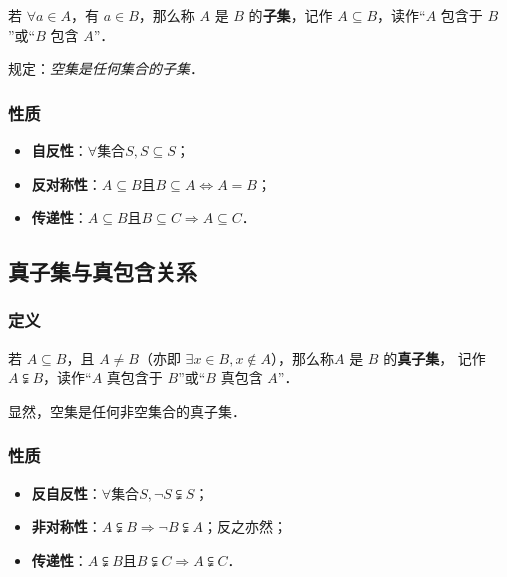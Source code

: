 \documentclass[a4paper,openany]{ctexbook}
\begin{document}
若 \(\forall a \in A\)，有 \(a \in B\)，那么称 \(A\) 是 \(B\) 的\textbf{子集}，记作 \(A \subseteq B\)，读作“\(A\) 包含于 \(B\)”或“\(B\) 包含 \(A\)”．

规定：\textit{空集是任何集合的子集}．

\subsubsection{性质}

\begin{itemize}
    \item \textbf{自反性}：\(\forall \text{集合} S, S \subseteq S\)；
    \item \textbf{反对称性}：\(A \subseteq B \text{且} B \subseteq A \Leftrightarrow A=B\)；
    \item \textbf{传递性}：\(A \subseteq B \text{且} B\subseteq C \Rightarrow A \subseteq C\)．
\end{itemize}

\subsection{真子集与真包含关系}

\subsubsection{定义}

若 \(A \subseteq B\)，且 \(A \ne B\)（亦即 \(\exists x \in B, x \not\in A\)），那么称\(A\) 是 \(B\) 的\textbf{真子集}，
记作 \(A \subsetneqq B\)，读作“\(A\) 真包含于 \(B\)”或“\(B\) 真包含 \(A\)”．

显然，空集是任何非空集合的真子集．

\subsubsection{性质}

\begin{itemize}
    \item \textbf{反自反性}：\(\forall \text{集合} S, \lnot S\subsetneqq S\)；
    \item \textbf{非对称性}：\(A \subsetneqq B \Rightarrow \lnot B\subsetneqq A\)；反之亦然；
    \item \textbf{传递性}：\(A \subsetneqq B \text{且} B\subsetneqq C \Rightarrow A\subsetneqq C\)．
\end{itemize}
\end{document}
